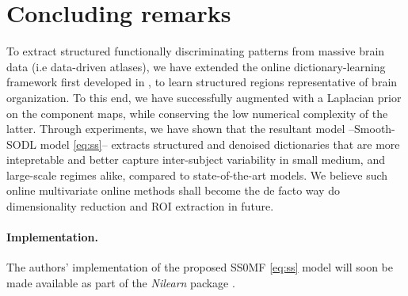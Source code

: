 \section{Concluding remarks}
To extract structured functionally discriminating patterns
from massive brain data (i.e data-driven atlases), we have extended
the online dictionary-learning framework first developed in
 \cite{mairal2010}, to learn structured regions
representative of brain organization. To this end, we have successfully augmented  \cite{mairal2010} with a Laplacian prior on the component maps,
while conserving the low numerical complexity of the latter.
Through experiments, we have shown that the resultant model --Smooth-SODL model \eqref{eq:ss}-- extracts structured and denoised dictionaries that are more intepretable and better capture inter-subject variability in small medium, and large-scale regimes alike, compared to state-of-the-art models.
We believe such online multivariate online methods shall become the de facto
way do dimensionality reduction and ROI extraction in future.

\paragraph{Implementation.} The authors' implementation of the proposed
SS0MF \eqref{eq:ss} model will soon be made available as part of the
\textit{Nilearn} package  \cite{nilearn}.










